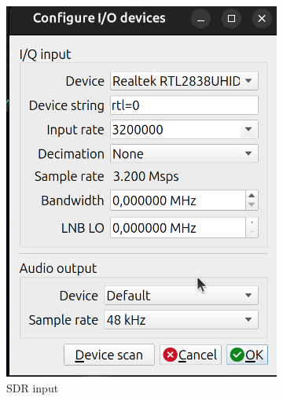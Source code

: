 \begin{figure}[h]
\centering
\begin{subfigure}{0.4\textwidth}
  \centering
  \includegraphics[width=\textwidth]{images/gqrx2.png}
  \caption{SDR input}
  \label{term331}
\end{subfigure}
\hspace{0.5cm} %
\begin{subfigure}{0.4\textwidth}
  \centering

\end{subfigure}
\end{figure}
